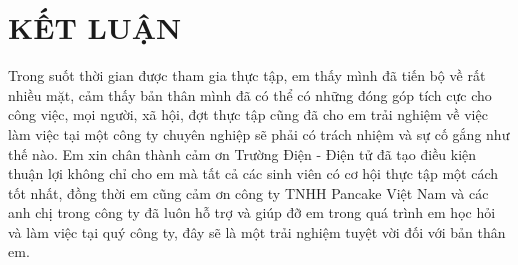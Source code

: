 
\section*{KẾT LUẬN}

Trong suốt thời gian được tham gia thực tập, em thấy mình đã tiến bộ về rất nhiều mặt, cảm thấy bản thân mình đã có thể
có những đóng góp tích cực cho công việc, mọi người, xã hội, đợt thực tập cũng đã cho em trải nghiệm về việc làm việc
tại một công ty chuyên nghiệp sẽ phải có trách nhiệm và sự cố gắng như thế nào. Em xin chân thành
cảm ơn Trường Điện - Điện tử đã tạo điều kiện thuận lợi không chỉ cho em mà tất cả các sinh viên có cơ hội thực tập một
cách tốt nhất, đồng thời em cũng cảm ơn công ty TNHH Pancake Việt Nam và các anh chị trong công ty đã luôn hỗ trợ và giúp
đỡ em trong quá trình em học hỏi và làm việc tại quý công ty, đây sẽ là một trải nghiệm tuyệt vời đối với bản thân em.

\cleardoublepage
